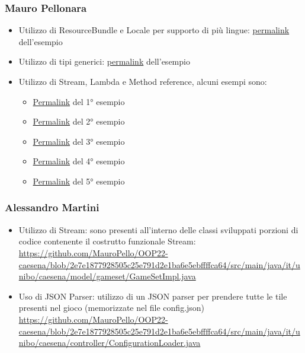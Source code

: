 \subsubsection*{Mauro Pellonara}
\begin{itemize}
    \item Utilizzo di ResourceBundle e Locale per supporto di più lingue: \href{https://github.com/MauroPello/OOP22-caesena/blob/5fae6d5fd9f79fe417edee91115e3c74f08d6e0d/src/main/java/it/unibo/caesena/view/LocaleHelper.java}{permalink} dell'esempio
    \item Utilizzo di tipi generici: \href{https://github.com/MauroPello/OOP22-caesena/blob/5fae6d5fd9f79fe417edee91115e3c74f08d6e0d/src/main/java/it/unibo/caesena/view/scene/Scene.java}{permalink} dell'esempio
    \item Utilizzo di Stream, Lambda e Method reference, alcuni esempi sono:
    \begin{itemize}
        \item \href{https://github.com/MauroPello/OOP22-caesena/blob/b817cad200379d563deda711ebf7773b572fb061/src/main/java/it/unibo/caesena/model/GameSetTileMediatorImpl.java#L107}{Permalink} del 1° esempio
        \item \href{https://github.com/MauroPello/OOP22-caesena/blob/dff66c49fc9fb8e6bdd8d328986f4b9ee3a4b2dc/src/main/java/it/unibo/caesena/controller/ControllerImpl.java#L134}{Permalink} del 2° esempio
        \item \href{https://github.com/MauroPello/OOP22-caesena/blob/dff66c49fc9fb8e6bdd8d328986f4b9ee3a4b2dc/src/main/java/it/unibo/caesena/controller/ControllerImpl.java#L390}{Permalink} del 3° esempio
        \item \href{https://github.com/MauroPello/OOP22-caesena/blob/b817cad200379d563deda711ebf7773b572fb061/src/main/java/it/unibo/caesena/model/GameSetTileMediatorImpl.java#L203}{Permalink} del 4° esempio
        \item \href{https://github.com/MauroPello/OOP22-caesena/blob/b817cad200379d563deda711ebf7773b572fb061/src/main/java/it/unibo/caesena/model/GameSetTileMediatorImpl.java#L213}{Permalink} del 5° esempio
    \end{itemize}
\end{itemize}

\subsubsection*{Alessandro Martini}
\begin{itemize}
    \item Utilizzo di Stream: sono presenti all'interno delle classi sviluppati porzioni di codice contenente il costrutto funzionale Stream: \url{https://github.com/MauroPello/OOP22-caesena/blob/2e7e1877928505c25e791d2e1ba6e5ebffffca64/src/main/java/it/unibo/caesena/model/gameset/GameSetImpl.java}
    \item Uso di JSON Parser: utilizzo di un JSON parser per prendere tutte le tile presenti nel gioco (memorizzate nel file config.json) \url{https://github.com/MauroPello/OOP22-caesena/blob/2e7e1877928505c25e791d2e1ba6e5ebffffca64/src/main/java/it/unibo/caesena/controller/ConfigurationLoader.java}
\end{itemize}


